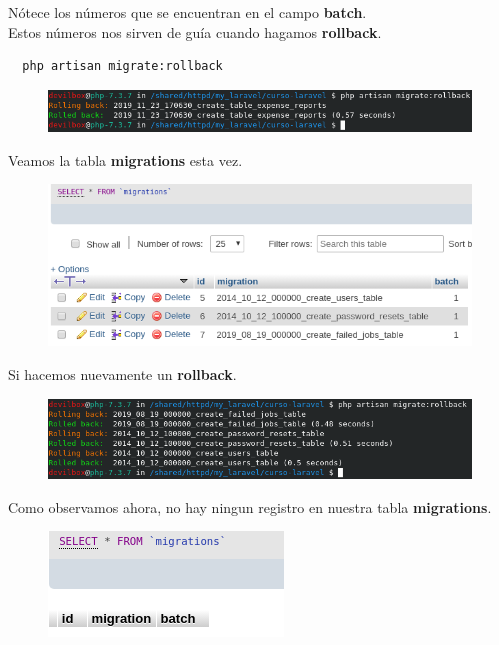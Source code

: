 \documentclass{article}
\begin{document}
Nótece los números que se encuentran en el campo \textbf{batch}.\\
Estos números nos sirven de guía cuando hagamos \textbf{rollback}.

\begin{verbatim}
  php artisan migrate:rollback
\end{verbatim}

\begin{figure}[h!]
  \centering
  \includegraphics[scale=0.75]{./Pictures/032_rollback.png}
\end{figure}

Veamos la tabla \textbf{migrations} esta vez.

\begin{figure}[h!]
  \centering
  \includegraphics[scale=0.75]{./Pictures/033_migrations_table.png}
\end{figure}

Si hacemos nuevamente un \textbf{rollback}.

\begin{figure}[h!]
  \centering
  \includegraphics[scale=0.75]{./Pictures/034_rolback.png}
\end{figure}

Como observamos ahora, no hay ningun registro en nuestra tabla
\textbf{migrations}.

\begin{figure}[h!]
  \centering
  \includegraphics[scale=0.75]{./Pictures/035_migrations_table.png}
\end{figure}
\end{document}
